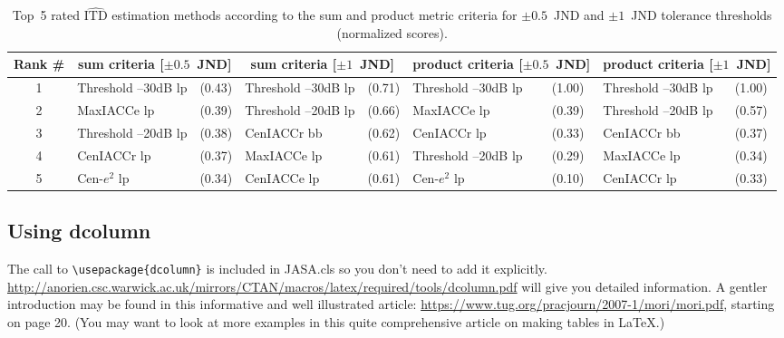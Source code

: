 \begin{table*}[b]
\caption{Top~5 rated $\widehat{\textrm{ITD}}$ estimation methods
according to the sum and product metric criteria for $\pm0.5$~JND and
$\pm1$~JND tolerance thresholds (normalized scores).}

\begin{adjustbox}{width=\textwidth}
\begin{tabular}{c| l l| l l| l l| l l}
\hline\hline
Rank \#& \multicolumn{2}{c}{sum criteria [$\pm0.5$~JND]} &
\multicolumn{2}{|c}{sum criteria [$\pm1$~JND]} &
\multicolumn{2}{|c}{product criteria [$\pm0.5$~JND]} & \multicolumn{2}{|c}{product criteria [$\pm1$~JND]}\\
\hline
1 & Threshold --30dB {lp} & (0.43) & Threshold --30dB {lp} & (0.71) & Threshold --30dB {lp} & (1.00) & Threshold --30dB {lp} & (1.00) \\
2 & MaxIACCe {lp} & (0.39) & Threshold --20dB {lp} & (0.66) & MaxIACCe {lp} & (0.39) & Threshold --20dB {lp} & (0.57) \\
3 & Threshold --20dB {lp} & (0.38) & CenIACCr {bb} &(0.62) & CenIACCr {lp} &(0.33) & CenIACCr {bb} & (0.37) \\
4 & CenIACCr {lp} &(0.37) & MaxIACCe {lp} & (0.61) & Threshold --20dB {lp} & (0.29) & MaxIACCe {lp} & (0.34) \\
5 & Cen-$e^2$ {lp} &(0.34) & CenIACCe {lp} & (0.61) & Cen-$e^2$ {lp}
& (0.10) & CenIACCr {lp} & (0.33) \\
\hline\hline
\end{tabular}
\end{adjustbox}

\label{tab:topMethods}
\end{table*}



\clearpage


\subsection{Using dcolumn}
The call to \verb+\usepackage{dcolumn}+ is included in JASA.cls so you
don't need to add it explicitly.
\href{http://anorien.csc.warwick.ac.uk/mirrors/CTAN/macros/latex/required/tools/dcolumn.pdf}
{\url{http://anorien.csc.warwick.ac.uk/mirrors/CTAN/macros/latex/required/tools/dcolumn.pdf}}
will give you detailed information.
A gentler introduction may be found in this informative and well
illustrated
article: \href{https://www.tug.org/pracjourn/2007-1/mori/mori.pdf}
{\url{https://www.tug.org/pracjourn/2007-1/mori/mori.pdf}}, starting on page
20. (You may want to look at more examples in this quite comprehensive
article on making tables in \LaTeX.)

